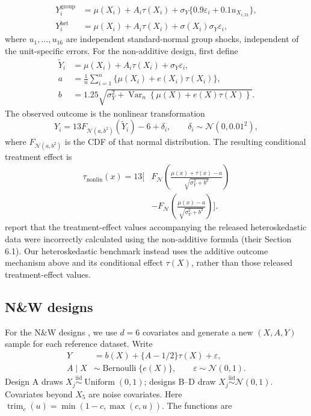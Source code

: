 \begin{landscape}
\[\begin{aligned}
Y_i^{\mathrm{group}}&=\mu(X_i)+A_i\tau(X_i)+\sigma_Y\{0.9\varepsilon_i+0.1u_{X_{i,21}}\},\\
Y_i^{\mathrm{het}}&=\mu(X_i)+A_i\tau(X_i)+\sigma(X_i)\sigma_Y\varepsilon_i,
\end{aligned}
\]
where \(u_1,\ldots,u_{16}\) are independent standard-normal group shocks, independent of the unit-specific errors. For the non-additive design, first define
\[
\begin{aligned}
\widetilde Y_i&=\mu(X_i)+A_i\tau(X_i)+\sigma_Y\varepsilon_i,\\
a&=\frac1n\sum_{i=1}^n\{\mu(X_i)+e(X_i)\tau(X_i)\},\\
b&=1.25\sqrt{\sigma_Y^2+\operatorname{Var}_n\!\left\{\mu(X)+e(X)\tau(X)\right\}}.
\end{aligned}
\]
The observed outcome is the nonlinear transformation
\[
Y_i=13F_{\mathcal N(a,b^2)}(\widetilde Y_i)-6+\delta_i,
\qquad
\delta_i\sim\mathcal N(0,0.01^2),
\]
where \(F_{\mathcal N(a,b^2)}\) is the CDF of that normal distribution. The resulting conditional treatment effect is
\[
\begin{aligned}
\tau_{\mathrm{nonlin}}(x)
=13\Bigg[&
F_{\!\mathcal N}\!\left(
\frac{\mu(x)+\tau(x)-a}{\sqrt{\sigma_Y^2+b^2}}
\right)\\
&-F_{\!\mathcal N}\!\left(
\frac{\mu(x)-a}{\sqrt{\sigma_Y^2+b^2}}
\right)
\Bigg].
\end{aligned}
\]
 report that the treatment-effect values accompanying the released heteroskedastic data were incorrectly calculated using the non-additive formula (their Section 6.1). Our heteroskedastic benchmark instead uses the additive outcome mechanism above and its conditional effect \(\tau(X)\), rather than those released treatment-effect values.

\subsection{N\&W designs}

For the N\&W designs \cite{nieQuasioracleEstimationHeterogeneous2021}, we use \(d=6\) covariates and generate a new \((X,A,Y)\) sample for each reference dataset. Write
\[
\begin{aligned}
Y&=b(X)+\{A-1/2\}\tau(X)+\varepsilon,\\
A\mid X&\sim\operatorname{Bernoulli}\{e(X)\},
\qquad \varepsilon\sim\mathcal N(0,1).
\end{aligned}
\]
Design A draws \(X_j\overset{\mathrm{iid}}{\sim}\operatorname{Uniform}(0,1)\); designs B--D draw \(X_j\overset{\mathrm{iid}}{\sim}\mathcal N(0,1)\). Covariates beyond \(X_5\) are noise covariates. Here \(\operatorname{trim}_{c}(u)=\min(1-c,\max(c,u))\). The functions are


\end{landscape}
